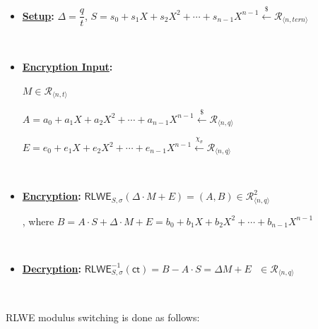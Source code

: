 \begin{itemize}
\item \textbf{\underline{Setup}: } 
$\Delta = \dfrac{q}{t}$, \text{ } $S = s_0 + s_1X + s_2X^2 + \cdots + s_{n-1}X^{n-1} \xleftarrow{\$} \mathcal{R}_{\langle n, \textit{tern} \rangle}$

$ $

\item \textbf{\underline{Encryption Input}: } 

$M \in \mathcal{R}_{\langle n, t \rangle}$

$A = a_0 + a_1X + a_2X^2 + \cdots + a_{n-1}X^{n-1} \xleftarrow{\$} \mathcal{R}_{\langle n, q \rangle}$

$E = e_0 + e_1X + e_2X^2 + \cdots + e_{n-1}X^{n-1} \xleftarrow{\chi_\sigma} \mathcal{R}_{\langle n, q \rangle}$ 

$ $

\item \textbf{\underline{Encryption}: } 
$\textsf{RLWE}_{S,\sigma}(\Delta \cdot M + E) = (A, B) \in \mathcal{R}_{\langle n,q \rangle}^2$ 

, where $B = A \cdot S + \Delta \cdot M + E = b_0 + b_1X + b_2X^2 + \cdots + b_{n-1}X^{n-1}$

$ $

\item \textbf{\underline{Decryption}: } $\textsf{RLWE}^{-1}_{S,\sigma}(\textsf{ct}) = B - A \cdot S = \Delta  M + E \text{ } \in \mathcal{R}_{\langle n,q \rangle}$ 
\end{itemize}

$ $

RLWE modulus switching is done as follows:

